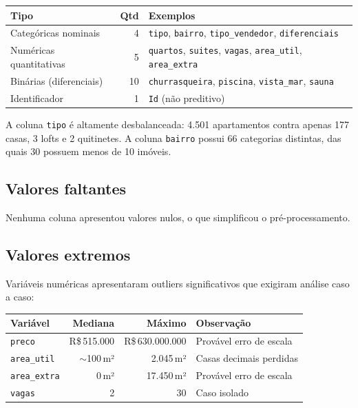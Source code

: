 \documentclass[12pt,a4paper]{article}
\begin{document}
\begin{table}[h]
\centering
\begin{tabular}{lrl}
\toprule
\textbf{Tipo} & \textbf{Qtd} & \textbf{Exemplos} \\
\midrule
Categóricas nominais     & 4  & \texttt{tipo}, \texttt{bairro}, \texttt{tipo\_vendedor}, \texttt{diferenciais} \\
Numéricas quantitativas   & 5  & \texttt{quartos}, \texttt{suites}, \texttt{vagas}, \texttt{area\_util}, \texttt{area\_extra} \\
Binárias (diferenciais)   & 10 & \texttt{churrasqueira}, \texttt{piscina}, \texttt{vista\_mar}, \texttt{sauna} \\
Identificador             & 1  & \texttt{Id} (não preditivo) \\
\bottomrule
\end{tabular}
\end{table}

A coluna \texttt{tipo} é altamente desbalanceada: 4.501 apartamentos contra apenas 177 casas, 3 lofts e 2 quitinetes. A coluna \texttt{bairro} possui 66 categorias distintas, das quais 30 possuem menos de 10 imóveis.

\subsection{Valores faltantes}

Nenhuma coluna apresentou valores nulos, o que simplificou o pré-processamento.

\subsection{Valores extremos}

Variáveis numéricas apresentaram outliers significativos que exigiram análise caso a caso:

\begin{table}[h]
\centering
\begin{tabular}{lrrl}
\toprule
\textbf{Variável} & \textbf{Mediana} & \textbf{Máximo} & \textbf{Observação} \\
\midrule
\texttt{preco}       & R\$\,515.000 & R\$\,630.000.000 & Provável erro de escala \\
\texttt{area\_util}  & $\sim$100\,m² & 2.045\,m²        & Casas decimais perdidas \\
\texttt{area\_extra} & 0\,m²         & 17.450\,m²       & Provável erro de escala \\
\texttt{vagas}       & 2             & 30                & Caso isolado \\
\bottomrule
\end{tabular}
\end{table}
\end{document}
